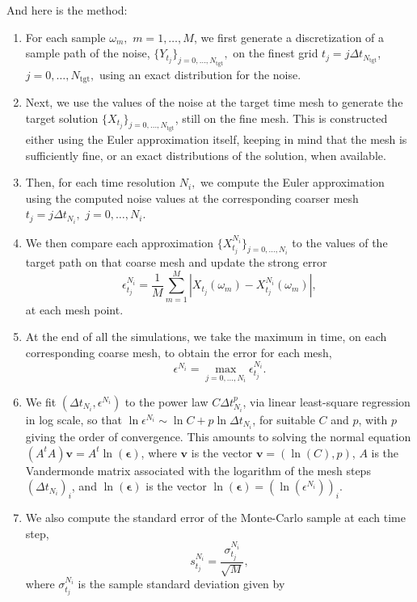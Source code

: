 \documentclass[reqno,12pt]{amsart}
\theoremstyle{plain} %
\theoremstyle{definition} %
\begin{document}
And here is the method:
\begin{enumerate}
    \item For each sample $\omega_m,$ $m=1, \ldots, M$, we first generate a discretization of a sample path of the noise, $\{Y_{t_j}\}_{j=0, \ldots, N_{\mathrm{tgt}}},$ on the finest grid $t_j = j \Delta t_{N_{\textrm{tgt}}}$, $j = 0, \ldots, N_{\mathrm{tgt}},$ using an exact distribution for the noise.
    \item Next, we use the values of the noise at the target time mesh to generate the target solution $\{X_{t_j}\}_{j=0, \ldots, N_{\mathrm{tgt}}}$, still on the fine mesh. This is constructed either using the Euler approximation itself, keeping in mind that the mesh is sufficiently fine, or an exact distributions of the solution, when available.
    \item Then, for each time resolution $N_i,$ we compute the Euler approximation using the computed noise values at the corresponding coarser mesh $t_j = j\Delta t_{N_i},$ $j=0, \ldots, N_i.$
    \item We then compare each approximation $\{X_{t_j}^{N_i}\}_{j=0, \ldots, N_i}$ to the values of the target path on that coarse mesh and update the strong error
    \[
        \epsilon_{t_j}^{N_i} = \frac{1}{M}\sum_{m=1}^M \left|X_{t_j}(\omega_m) - X_{t_j}^{N_i}(\omega_m)\right|,
    \]
    at each mesh point.
    \item At the end of all the simulations, we take the maximum in time, on each corresponding coarse mesh, to obtain the error for each mesh,
    \[
        \epsilon^{N_i} = \max_{j=0, \ldots, N_i} \epsilon_{t_j}^{N_i}.
    \]
    \item We fit $(\Delta t_{N_i}, \epsilon^{N_i})$ to the power law $C\Delta t_{N_i}^p$, via linear least-square regression in log scale, so that $\ln \epsilon^{N_i} \sim \ln C + p \ln \Delta t_{N_i}$, for suitable $C$ and $p$, with $p$ giving the order of convergence. This amounts to solving the normal equation $(A^tA)\mathbf{v} = A^t\ln(\boldsymbol{\epsilon})$, where $\mathbf{v}$ is the vector $\mathbf{v} = (\ln(C), p)$, $A$ is the Vandermonde matrix associated with the logarithm of the mesh steps $(\Delta t_{N_i})_i$, and $\ln(\boldsymbol{\epsilon})$ is the vector $\ln(\boldsymbol{\epsilon}) = (\ln(\epsilon^{N_i}))_i$.
    \item We also compute the standard error of the Monte-Carlo sample at each time step,
    \[
        s_{t_j}^{N_i} = \frac{\sigma_{t_j}^{N_i}}{\sqrt{M}},
    \]
    where $\sigma_{t_j}^{N_i}$ is the sample standard deviation given by

\end{enumerate}
\end{document}
